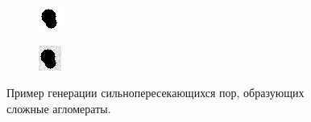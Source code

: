 \documentclass[code]{wordcore}
\begin{document}
\begin{figure}[H]
	\centering
	\begin{subfigure}[t]{0.48\textwidth}
		\includegraphics[width=\textwidth]{fig/high_overlap_clean.png}
	\end{subfigure}
	\hfill
	\begin{subfigure}[t]{0.48\textwidth}
		\includegraphics[width=\textwidth]{fig/high_overlap_noise.png}
	\end{subfigure}
	\caption{Пример генерации сильнопересекающихся пор, образующих сложные агломераты.}
\end{figure}
\end{document}
